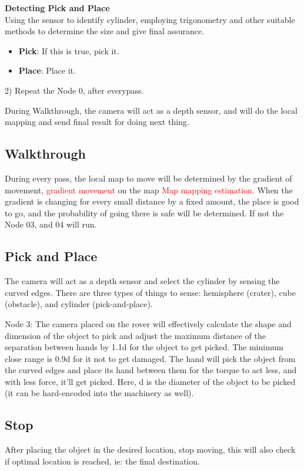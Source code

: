 \documentclass{article}
\begin{document}
\textbf{Detecting Pick and Place}\\
Using the sensor to identify cylinder, employing trigonometry and other suitable methods to determine the size and give final assurance.

\begin{itemize}
    \item \textbf{Pick}: If this is true, pick it.
    \item \textbf{Place}: Place it.
\end{itemize}

2) Repeat the Node 0, after everypass.

\vspace{2mm}
During Walkthrough, the camera will act as a depth sensor, and will do the local mapping and send final result for doing next thing.

\newpage

\subsection{Walkthrough}
During every pass, the local map to move will be determined by the gradient of movement, \textcolor{red}{gradient movement} on the map \textcolor{red}{Map mapping estimation}. When the gradient is changing for every small distance by a fixed amount, the place is good to go, and the probability of going there is safe will be determined. If not the Node 03, and 04 will run.

\subsection{Pick and Place}
The camera will act as a depth sensor and select the cylinder by sensing the curved edges. There are three types of things to sense: hemisphere (crater), cube (obstacle), and cylinder (pick-and-place).

Node 3: The camera placed on the rover will effectively calculate the shape and dimension of the object to pick and adjust the maximum distance of the separation between hands by 1.1d for the object to get picked. The minimum close range is 0.9d for it not to get damaged. The hand will pick the object from the curved edges and place its hand between them for the torque to act less, and with less force, it'll get picked. Here, d is the diameter of the object to be picked (it can be hard-encoded into the machinery as well).

\subsection{Stop}
After placing the object in the desired location, stop moving, this will also check if optimal location is reached, ie: the final destination.
\newpage
\end{document}
